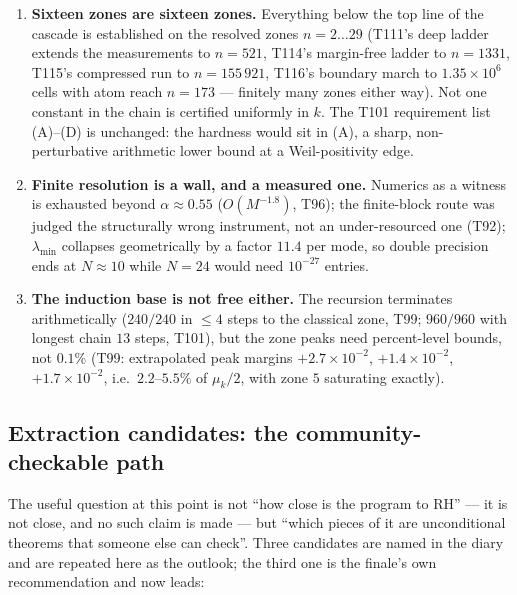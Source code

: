 \documentclass[11pt,a4paper]{article}
\begin{document}
\begin{enumerate}[leftmargin=1.6em]
\item \textbf{Sixteen zones are sixteen zones.} Everything below the top line of the cascade is
established on the resolved zones $n=2\ldots29$ (T111's deep ladder extends the measurements to
$n=521$, T114's margin-free ladder to $n=1331$, T115's compressed run to $n=155\,921$, T116's
boundary march to $1.35\times10^{6}$ cells with atom reach $n=173$ --- finitely many zones either way). Not one constant in the chain is certified uniformly in
$k$. The T101 requirement list (A)--(D) is unchanged: the hardness would sit in (A), a sharp,
non-perturbative arithmetic lower bound at a Weil-positivity edge.
\item \textbf{Finite resolution is a wall, and a measured one.} Numerics as a witness is exhausted
beyond $\alpha\approx0.55$ ($O(M^{-1.8})$, T96); the finite-block route was judged the structurally
wrong instrument, not an under-resourced one (T92); $\lambda_{\min}$ collapses geometrically by a factor
$11.4$ per mode, so double precision ends at $N\approx10$ while $N=24$ would need $10^{-27}$ entries.
\item \textbf{The induction base is not free either.} The recursion terminates arithmetically
($240/240$ in $\le4$ steps to the classical zone, T99; $960/960$ with longest chain $13$ steps, T101),
but the zone peaks need percent-level bounds, not $0.1\%$ (T99: extrapolated peak margins
$+2.7\times10^{-2}$, $+1.4\times10^{-2}$, $+1.7\times10^{-2}$, i.e.\ $2.2$--$5.5\%$ of $\mu_k/2$, with
zone $5$ saturating exactly).
\end{enumerate}

\subsection{Extraction candidates: the community-checkable path}
The useful question at this point is not ``how close is the program to RH'' --- it is not close, and no
such claim is made --- but ``which pieces of it are unconditional theorems that someone else can
check''. Three candidates are named in the diary and are repeated here as the outlook; the third one
is the finale's own recommendation and now leads:
\end{document}
